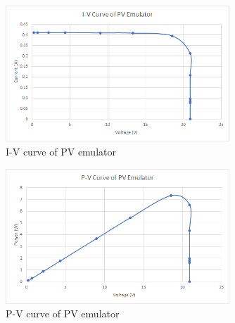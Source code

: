 \documentclass[]{article}
\begin{document}
				\begin{figure}[H]
					\centering
					\includegraphics[width=0.75\textwidth]{Lab3Results/IVCurve}
					\caption{I-V curve of PV emulator}
					\label{fig:Lab3IV}
				\end{figure}
				\begin{figure}[H]
					\centering
					\includegraphics[width=0.75\textwidth]{Lab3Results/PVCurve}
					\caption{P-V curve of PV emulator}
					\label{fig:Lab3PV}
				\end{figure}
			
\end{document}
